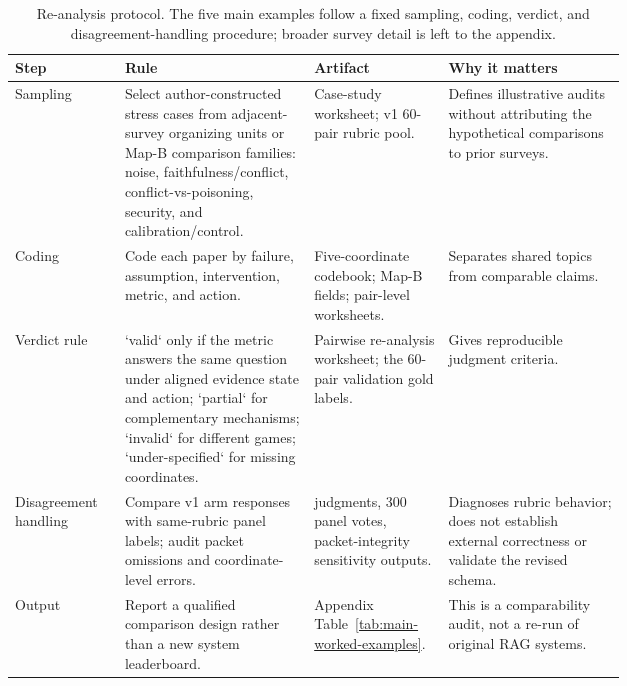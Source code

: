 \begin{table}[t]
\centering
\scriptsize
\renewcommand{\arraystretch}{0.9}
\begin{tabularx}{\linewidth}{>{\raggedright\arraybackslash}p{0.18\linewidth}>{\raggedright\arraybackslash}p{0.31\linewidth}>{\raggedright\arraybackslash}p{0.22\linewidth}X}
\toprule
\textbf{Step} & \textbf{Rule} & \textbf{Artifact} & \textbf{Why it matters} \\
\midrule
Sampling & Select author-constructed stress cases from adjacent-survey organizing units or Map-B comparison families: noise, faithfulness/conflict, conflict-vs-poisoning, security, and calibration/control. & Case-study worksheet; v1 60-pair rubric pool. & Defines illustrative audits without attributing the hypothetical comparisons to prior surveys. \\
Coding & Code each paper by failure, assumption, intervention, metric, and action. & Five-coordinate codebook; Map-B fields; pair-level worksheets. & Separates shared topics from comparable claims. \\
Verdict rule & `valid` only if the metric answers the same question under aligned evidence state and action; `partial` for complementary mechanisms; `invalid` for different games; `under-specified` for missing coordinates. & Pairwise re-analysis worksheet; the 60-pair validation gold labels. & Gives reproducible judgment criteria. \\
Disagreement handling & Compare v1 arm responses with same-rubric panel labels; audit packet omissions and coordinate-level errors. & 720 judgments, 300 panel votes, packet-integrity sensitivity outputs. & Diagnoses rubric behavior; does not establish external correctness or validate the revised schema. \\
Output & Report a qualified comparison design rather than a new system leaderboard. & Appendix Table~\ref{tab:main-worked-examples}. & This is a comparability audit, not a re-run of original RAG systems. \\
\bottomrule
\end{tabularx}
\caption{Re-analysis protocol. The five main examples follow a fixed sampling, coding, verdict, and disagreement-handling procedure; broader survey detail is left to the appendix.}
\label{tab:reanalysis-protocol}
\end{table}
